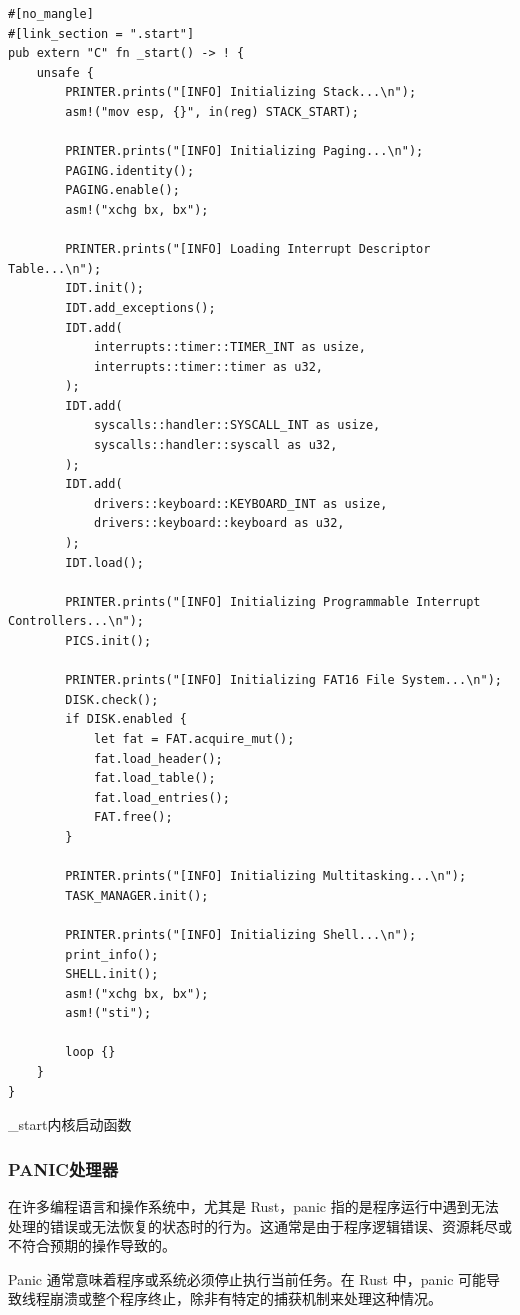 \begin{listing}[htbp]
    \begin{verbatim}
#[no_mangle]
#[link_section = ".start"]
pub extern "C" fn _start() -> ! {
    unsafe {
        PRINTER.prints("[INFO] Initializing Stack...\n");
        asm!("mov esp, {}", in(reg) STACK_START);

        PRINTER.prints("[INFO] Initializing Paging...\n");
        PAGING.identity();
        PAGING.enable();
        asm!("xchg bx, bx");

        PRINTER.prints("[INFO] Loading Interrupt Descriptor Table...\n");
        IDT.init();
        IDT.add_exceptions();
        IDT.add(
            interrupts::timer::TIMER_INT as usize,
            interrupts::timer::timer as u32,
        );
        IDT.add(
            syscalls::handler::SYSCALL_INT as usize,
            syscalls::handler::syscall as u32,
        );
        IDT.add(
            drivers::keyboard::KEYBOARD_INT as usize,
            drivers::keyboard::keyboard as u32,
        );
        IDT.load();

        PRINTER.prints("[INFO] Initializing Programmable Interrupt Controllers...\n");
        PICS.init();

        PRINTER.prints("[INFO] Initializing FAT16 File System...\n");
        DISK.check();
        if DISK.enabled {
            let fat = FAT.acquire_mut();
            fat.load_header();
            fat.load_table();
            fat.load_entries();
            FAT.free();
        }

        PRINTER.prints("[INFO] Initializing Multitasking...\n");
        TASK_MANAGER.init();

        PRINTER.prints("[INFO] Initializing Shell...\n");
        print_info();
        SHELL.init();
        asm!("xchg bx, bx");
        asm!("sti");

        loop {}
    }
}
    \end{verbatim}
    \caption{\_start内核启动函数}\label{lst:KernelBootFunction}
\end{listing}

\subsubsection{PANIC处理器}

在许多编程语言和操作系统中，尤其是 Rust，panic 指的是程序运行中遇到无法处理的错误或无法恢复的状态时的行为。这通常是由于程序逻辑错误、资源耗尽或不符合预期的操作导致的。

Panic 通常意味着程序或系统必须停止执行当前任务。在 Rust 中，panic 可能导致线程崩溃或整个程序终止，除非有特定的捕获机制来处理这种情况。

